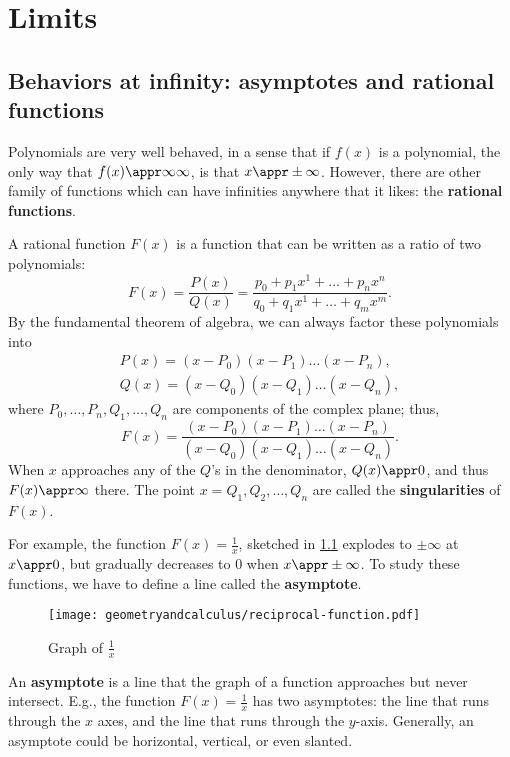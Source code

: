 \chapter{Limits}

\section{Behaviors at infinity: asymptotes and rational functions}

Polynomials are very well behaved, in a sense that if $f(x)$ is a polynomial, the only way that $f(x) \appr \infty\infty$, is that $x \appr \pm\infty$. However, there are other family of functions which can have infinities anywhere that it likes: the \textbf{rational functions}.

A rational function $F(x)$ is a function that can be written as a ratio of two polynomials:
\begin{equation}
	F(x) = \frac{P(x)}{Q(x)} = \frac{p_0 + p_1x^1 + \dots + p_nx^n}{q_0 + q_1x^1 + \dots + q_mx^m}.
\end{equation}
By the fundamental theorem of algebra, we can always factor these polynomials into
\begin{equation}
	\begin{multlined}
		P(x) = (x - P_0)(x - P_1)\dots(x - P_n), \\
		Q(x) = (x - Q_0)(x - Q_1)\dots(x - Q_n),
	\end{multlined}
\end{equation}
where $P_0, \dots, P_n, Q_1, \dots, Q_n$ are components of the complex plane; thus,
\begin{equation}
	F(x) = \frac{(x - P_0)(x - P_1)\dots(x - P_n)}{(x - Q_0)(x - Q_1)\dots(x - Q_n)}.
\end{equation}
When $x$ approaches any of the $Q$'s in the denominator, $Q(x) \appr 0$, and thus $F(x) \appr \infty$ there. The point $x = Q_1, Q_2, \dots, Q_n$ are called the \textbf{singularities} of $F(x)$.

For example, the function $F(x) = \frac{1}{x}$, sketched in \cref{fig:reciprocal-function} explodes to $\pm\infty$ at $x \appr 0$, but gradually decreases to $0$ when $x \appr \pm\infty$. To study these functions, we have to define a line called the \textbf{asymptote}.
\begin{figure}[ht]
	\centering
	\texttt{[image: geometryandcalculus/reciprocal-function.pdf]}
	\caption{Graph of $\frac{1}{x}$}
	\label{fig:reciprocal-function}
\end{figure}

An \textbf{asymptote} is a line that the graph of a function approaches but never intersect. E.g., the function $F(x) = \frac{1}{x}$ has two asymptotes: the line that runs through the $x$ axes, and the line that runs through the $y$-axis. Generally, an asymptote could be horizontal, vertical, or even slanted.

